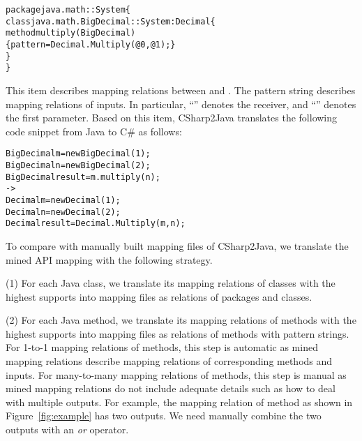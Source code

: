 \begin{CodeOut}\vspace*{-1ex}
\begin{alltt}
package java.math :: System \{
  class java.math.BigDecimal :: System:Decimal \{
    method multiply(BigDecimal)
       \{ pattern =  Decimal.Multiply(@0, @1); \}
  \}
\}
\end{alltt}
\end{CodeOut}\vspace*{-1ex}

This item describes mapping relations between  and . The
pattern string describes mapping relations of inputs. In particular,
``'' denotes the receiver, and ``'' denotes
the first parameter. Based on this item, CSharp2Java translates the
following code snippet from Java to C\# as follows:

\begin{CodeOut}\vspace*{-1ex}
\begin{alltt}
  BigDecimal m = new BigDecimal(1);
  BigDecimal n = new BigDecimal(2);
  BigDecimal result = m.multiply(n);
  ->
  Decimal m = new Decimal(1);
  Decimal n = new Decimal(2);
  Decimal result = Decimal.Multiply(m,n);
\end{alltt}
\end{CodeOut}\vspace*{-1ex}

To compare with manually built mapping files of CSharp2Java, we
translate the mined API mapping with the following strategy.

(1) For each Java class, we translate its mapping relations of
classes with the highest supports into mapping files as relations of
packages and classes.

(2) For each Java method, we translate its mapping relations of
methods with the highest supports into mapping files as relations of
methods with pattern strings. For 1-to-1 mapping relations of
methods, this step is automatic as mined mapping relations describe
mapping relations of corresponding methods and inputs. For
many-to-many mapping relations of methods, this step is manual as
mined mapping relations do not include adequate details such as how
to deal with multiple outputs. For example, the mapping relation of
method as shown in Figure~\ref{fig:example} has two outputs. We need
manually combine the two outputs with an \emph{or} operator.

